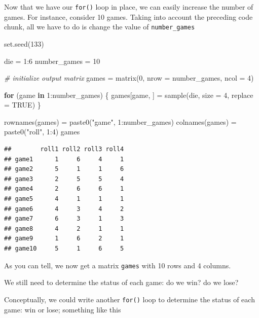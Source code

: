 \documentclass[
]{book}
\newenvironment{Shaded}{\begin{snugshade}}{\end{snugshade}}
\newcommand{\AttributeTok}[1]{\textcolor[rgb]{0.77,0.63,0.00}{#1}}
\newcommand{\CommentTok}[1]{\textcolor[rgb]{0.56,0.35,0.01}{\textit{#1}}}
\newcommand{\ConstantTok}[1]{\textcolor[rgb]{0.00,0.00,0.00}{#1}}
\newcommand{\ControlFlowTok}[1]{\textcolor[rgb]{0.13,0.29,0.53}{\textbf{#1}}}
\newcommand{\DecValTok}[1]{\textcolor[rgb]{0.00,0.00,0.81}{#1}}
\newcommand{\FunctionTok}[1]{\textcolor[rgb]{0.00,0.00,0.00}{#1}}
\newcommand{\NormalTok}[1]{#1}
\newcommand{\OtherTok}[1]{\textcolor[rgb]{0.56,0.35,0.01}{#1}}
\newcommand{\SpecialCharTok}[1]{\textcolor[rgb]{0.00,0.00,0.00}{#1}}
\newcommand{\StringTok}[1]{\textcolor[rgb]{0.31,0.60,0.02}{#1}}
\begin{document}
Now that we have our \texttt{for()} loop in place, we can easily increase the number
of games. For instance, consider 10 games. Taking into account the preceding
code chunk, all we have to do is change the value of \texttt{number\_games}

\begin{Shaded}
\begin{Highlighting}[]
\FunctionTok{set.seed}\NormalTok{(}\DecValTok{133}\NormalTok{)}

\NormalTok{die }\OtherTok{=} \DecValTok{1}\SpecialCharTok{:}\DecValTok{6}
\NormalTok{number\_games }\OtherTok{=} \DecValTok{10}

\CommentTok{\# initialize output matrix}
\NormalTok{games }\OtherTok{=} \FunctionTok{matrix}\NormalTok{(}\DecValTok{0}\NormalTok{, }\AttributeTok{nrow =}\NormalTok{ number\_games, }\AttributeTok{ncol =} \DecValTok{4}\NormalTok{)}

\ControlFlowTok{for}\NormalTok{ (game }\ControlFlowTok{in} \DecValTok{1}\SpecialCharTok{:}\NormalTok{number\_games) \{}
\NormalTok{  games[game, ] }\OtherTok{=} \FunctionTok{sample}\NormalTok{(die, }\AttributeTok{size =} \DecValTok{4}\NormalTok{, }\AttributeTok{replace =} \ConstantTok{TRUE}\NormalTok{)}
\NormalTok{\}}

\FunctionTok{rownames}\NormalTok{(games) }\OtherTok{=} \FunctionTok{paste0}\NormalTok{(}\StringTok{"game"}\NormalTok{, }\DecValTok{1}\SpecialCharTok{:}\NormalTok{number\_games)}
\FunctionTok{colnames}\NormalTok{(games) }\OtherTok{=} \FunctionTok{paste0}\NormalTok{(}\StringTok{"roll"}\NormalTok{, }\DecValTok{1}\SpecialCharTok{:}\DecValTok{4}\NormalTok{)}
\NormalTok{games}
\end{Highlighting}
\end{Shaded}

\begin{verbatim}
##        roll1 roll2 roll3 roll4
## game1      1     6     4     1
## game2      5     1     1     6
## game3      2     5     5     4
## game4      2     6     6     1
## game5      4     1     1     1
## game6      4     3     4     2
## game7      6     3     1     3
## game8      4     2     1     1
## game9      1     6     2     1
## game10     5     1     6     5
\end{verbatim}

As you can tell, we now get a matrix \texttt{games} with 10 rows and 4
columns.

We still need to determine the status of each game: do we win? do we lose?

Conceptually, we could write another \texttt{for()} loop to determine the status of
each game: win or lose; something like this
\end{document}
